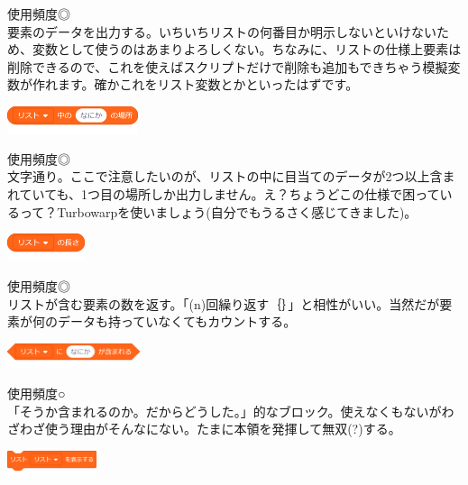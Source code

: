 \documentclass[b5paper,10pt]{jsarticle}
\begin{document}
\begin{multicols*}{3}
\begin{itembox}{6}
\end{itembox}
使用頻度◎\\
要素のデータを出力する。いちいちリストの何番目か明示しないといけないため、変数として使うのはあまりよろしくない。ちなみに、リストの仕様上要素は削除できるので、これを使えばスクリプトだけで削除も追加もできちゃう模擬変数が作れます。確かこれをリスト変数とかといったはずです。
\begin{itembox}{7}
\includegraphics[height=8mm]{images/lists_7.png}
\end{itembox}
使用頻度◎\\
文字通り。ここで注意したいのが、リストの中に目当てのデータが2つ以上含まれていても、1つ目の場所しか出力しません。え？ちょうどこの仕様で困っているって？Turbowarpを使いましょう(自分でもうるさく感じてきました)。
\begin{itembox}{8}
\includegraphics[height=8mm]{images/lists_8.png}
\end{itembox}
使用頻度◎\\
リストが含む要素の数を返す。「(n)回繰り返す｛｝」と相性がいい。当然だが要素が何のデータも持っていなくてもカウントする。
\begin{itembox}{9}
\includegraphics[width=39mm]{images/lists_9.png}
\end{itembox}
使用頻度○\\
「そうか含まれるのか。だからどうした。」的なブロック。使えなくもないがわざわざ使う理由がそんなにない。たまに本領を発揮して無双(?)する。
\begin{itembox}{10}
\includegraphics[height=8mm]{images/lists_10.png}


\end{itembox}
\end{multicols*}
\end{document}
